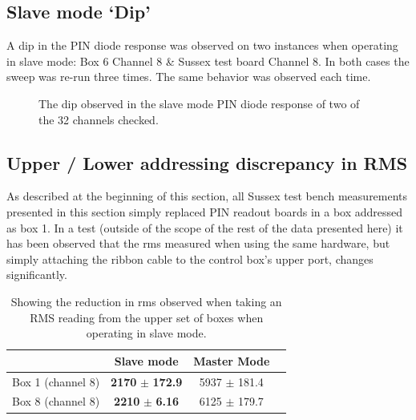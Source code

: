 \documentclass[12pt]{report}
\begin{document}
\subsection{Slave mode `Dip'}
A dip in the PIN diode response was observed on two instances when operating in slave mode: Box 6 Channel 8 \& Sussex test board Channel 8. In both cases the sweep was re-run three times. The same behavior was observed each time.

\begin{figure}[htp]
	\centering
	\caption{The dip observed in the slave mode PIN diode response of two of the 32 channels checked.}
	\label{fig:PINDip} 
\end{figure}

\subsection{Upper / Lower addressing discrepancy in RMS}
As described at the beginning of this section, all Sussex test bench measurements presented in this section simply replaced PIN readout boards in a box addressed as box 1. In a test (outside of the scope of the rest of the data presented here) it has been observed that the rms measured when using the same hardware, but simply attaching the ribbon cable to the control box’s upper port, changes significantly.

\begin{table}[t]
	\centering
	\begin{tabular}{| c | c | c | c |}
		\hline                        
		& Slave mode & Master Mode \\ \hline \hline
		Box 1 (channel 8) & \textbf{2170} $\pm$ \textbf{172.9}  & 5937 $\pm$ 181.4 \\ \hline
		Box 8 (channel 8) & \textbf{2210} $\pm$ \textbf{6.16}   & 6125 $\pm$ 179.7 \\ \hline
	\end{tabular}
	\caption{Showing the reduction in rms observed when taking an RMS reading from the upper set of boxes when operating in slave mode.}
	\label{tab:PinAdressing} 
\end{table}
\end{document}
